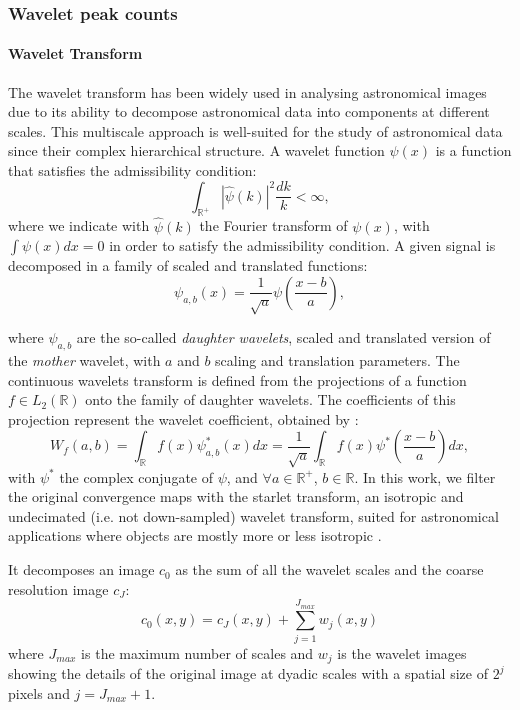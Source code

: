 \documentclass{aa}
\begin{document}
\subsubsection{Wavelet peak counts}
\paragraph{Wavelet Transform} The wavelet transform has been widely used in analysing astronomical images due to its ability to decompose astronomical data into components at different scales. 
This multiscale approach is well-suited for the study of astronomical data since their complex hierarchical structure. A wavelet function $\psi(x)$ is a function that satisfies the admissibility condition:
\begin{equation}
    \int_{\mathbb{R}^{+}} |\hat{\psi}(k)|^2 \frac{dk}{k}<\infty,
\end{equation}
where we indicate with $\hat{\psi}(k)$ the Fourier transform of $\psi(x)$, with $\int\psi(x)dx=0$ in order to satisfy the admissibility condition. 
A given signal is decomposed in a family of scaled and translated functions:
\begin{equation}
    \psi_{a,b}(x)=\frac{1}{\sqrt{a}}\psi \left( \frac{x-b}{a}\right),
\end{equation}

where $\psi_{a,b}$ are the so-called \textit{daughter wavelets}, scaled and translated version of the \textit{mother} wavelet, with $a$ and $b$ scaling and translation parameters.
The continuous wavelets transform is defined from the projections of a function $f \in L_2(\mathbb{R})$ onto the family of daughter wavelets. The coefficients of this projection represent the wavelet coefficient, obtained by :
\begin{equation}
    W_f(a,b)=\int_{\mathbb{R}} f(x)\psi^{*}_{a,b}(x)dx=\frac{1}{\sqrt{a}}\int_{\mathbb{R}}f(x)\psi^{*}\left( \frac{x-b}{a}\right)dx ,
\end{equation}
with $\psi^{*}$ the complex conjugate of $\psi$, and $ \forall a \in \mathbb{R}^{+}$, $ b \in \mathbb{R.}$  
In this work, we filter the original convergence maps with the starlet transform, an isotropic and undecimated (i.e. not down-sampled)  wavelet transform, suited for astronomical applications where objects are mostly more or less isotropic \citep{4060954}.

It decomposes an image $c_0$ as the sum of all the wavelet scales and the coarse resolution image $c_J$:
\begin{equation}\label{wav_des}
    c_0(x,y)=c_J(x,y)+\sum_{j=1}^{J_{max}} w_j(x,y)
\end{equation}
where $J_{max}$ is the maximum number of scales and $w_j$ is the wavelet images showing the details of the original image at dyadic scales with a spatial size of $2^j$ pixels and $j = J_{max} + 1$. 
\end{document}
